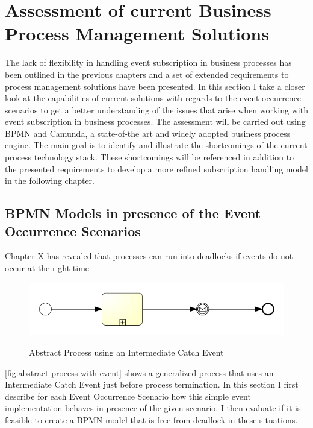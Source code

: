 \chapter{Assessment of current Business Process Management Solutions}\label{ch:assessment}

The lack of flexibility in handling event subscription in business processes has been outlined in the previous chapters and a set of extended requirements to process management solutions have been presented.
In this section I take a closer look at the capabilities of current solutions with regards to the event occurrence scenarios to get a better understanding of the issues that arise when working with event subscription in business processes.
The assessment will be carried out using BPMN and Camunda, a state-of-the art and widely adopted business process engine.
The main goal is to identify and illustrate the shortcomings of the current process technology stack. These shortcomings will be referenced in addition to the presented requirements to develop a more refined subscription handling model in the following chapter. 


\section{BPMN Models in presence of the Event Occurrence Scenarios}
Chapter X has revealed that processes can run into deadlocks if events do not occur at the right time 
\begin{figure}[]
	\myfloatalign
	{\includegraphics[width=1\linewidth]{chapters/assessment/process-with-intermediate-event.png}}
	\caption{Abstract Process using an Intermediate Catch Event}\label{fig:abstract-process-with-event}
\end{figure}

\autoref{fig:abstract-process-with-event} shows a generalized process that uses an Intermediate Catch Event just before process termination.
In this section I first describe for each Event Occurrence Scenario how this simple event implementation behaves in presence of the given scenario. I then evaluate if it is feasible to create a BPMN model that is free from deadlock in these situations. 

